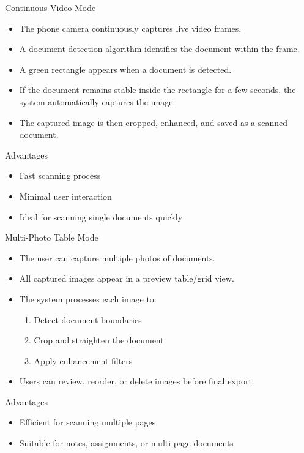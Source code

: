 \documentclass{beamer}
\begin{document}
\begin{frame}{Continuous Video Mode}
\begin{itemize}
    \item The phone camera continuously captures live video frames.
\item A document detection algorithm identifies the document within the frame.
\item A green rectangle appears when a document is detected.
\item If the document remains stable inside the rectangle for a few seconds, the system automatically captures the image.
\item The captured image is then cropped, enhanced, and saved as a scanned document.

\end{itemize}

Advantages
\begin{itemize}
\item Fast scanning process
\item Minimal user interaction
\item Ideal for scanning single documents quickly
\end{itemize}
\end{frame}

\begin{frame}{Multi-Photo Table Mode}
    \begin{itemize}
\item The user can capture multiple photos of documents.
\item All captured images appear in a preview table/grid view.
\item The system processes each image to:
\begin{enumerate}
    \item Detect document boundaries
\item Crop and straighten the document

\item Apply enhancement filters
\end{enumerate}
\item Users can review, reorder, or delete images before final export.
    \end{itemize}
Advantages
    \begin{itemize}
\item Efficient for scanning multiple pages
\item Suitable for notes, assignments, or multi-page documents
\end{itemize}
\end{frame}
\end{document}
